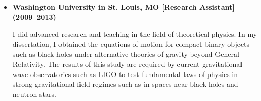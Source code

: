 \documentclass[10pt,a4paper]{moderncv}
\begin{document}
\begin{itemize}
\vspace{.2cm}
\item \textbf{Washington University in St. Louis, MO [Research Assistant] (2009--2013)}

	I did advanced research and teaching in the field of theoretical physics. In my dissertation, I obtained the equations of motion for compact binary objects such as black-holes under alternative theories of gravity beyond General Relativity. The results of this study are required by current gravitational-wave observatories such as LIGO to test fundamental laws of physics in strong gravitational field regimes such as in spaces near black-holes and neutron-stars.
\end{itemize}


\end{document}
